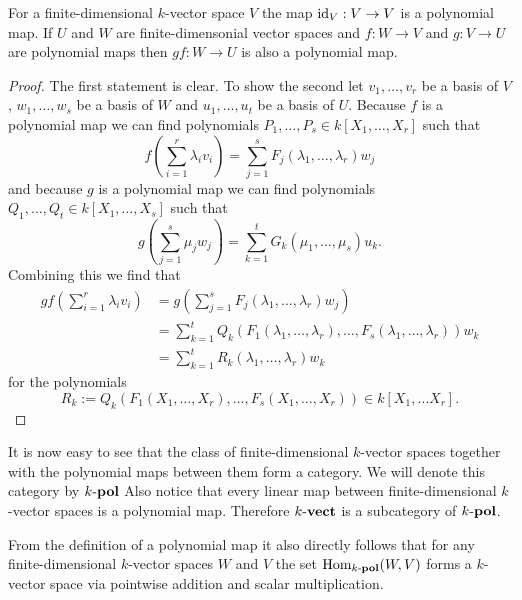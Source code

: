 \begin{lem}
 For a finite-dimensional $k$-vector space $V$ the map $\operatorname{id}_V : V \to V$ is a polynomial map. If $U$ and $W$ are finite-dimensonial vector spaces and $f : W \to V$ and $g : V \to U$ are polynomial maps then $gf : W \to U$ is also a polynomial map.
\end{lem}
\begin{proof}
 The first statement is clear. To show the second let $v_1, \ldots, v_r$ be a basis of $V$, $w_1, \ldots, w_s$ be a basis of $W$ and $u_1, \ldots, u_t$ be a basis of $U$. Because $f$ is a polynomial map we can find polynomials $P_1, \ldots, P_s \in k[X_1, \ldots, X_r]$ such that
 \[
  f\left(\sum_{i=1}^r \lambda_i v_i\right) = \sum_{j=1}^s F_j(\lambda_1, \ldots, \lambda_r) w_j
 \]
 and because $g$ is a polynomial map we can find polynomials $Q_1, \ldots, Q_t \in k[X_1, \ldots, X_s]$ such that
 \[
  g\left(\sum_{j=1}^s \mu_j w_j\right) = \sum_{k=1}^t G_k(\mu_1, \ldots, \mu_s) u_k.
 \]
 Combining this we find that
 \begin{align*}
  gf\left(\sum_{i=1}^r \lambda_i v_i\right)
  &= g\left(\sum_{j=1}^s F_j(\lambda_1, \ldots, \lambda_r) w_j\right) \\
  &= \sum_{k=1}^t Q_k(F_1(\lambda_1, \ldots, \lambda_r), \ldots, F_s(\lambda_1, \ldots, \lambda_r)) w_k \\
  &= \sum_{k=1}^t R_k(\lambda_1, \ldots, \lambda_r) w_k
 \end{align*}
 for the polynomials
 \[
  R_k := Q_k(F_1(X_1, \ldots, X_r), \ldots, F_s(X_1, \ldots, X_r)) \in k[X_1, \ldots X_r].
 \]
\end{proof}


It is now easy to see that the class of finite-dimensional $k$-vector spaces together with the polynomial maps between them form a category. We will denote this category by $k\text{-}\mathbf{pol}$  Also notice that every linear map between finite-dimensional $k$-vector spaces is a polynomial map. Therefore $k\text{-}\mathbf{vect}$ is a subcategory of $k\text{-}\mathbf{pol}$.

From the definition of a polynomial map it also directly follows that for any finite-dimensional $k$-vector spaces $W$ and $V$ the set $\operatorname{Hom}_{k\text{-}\mathbf{pol}}(W,V)$ forms a $k$-vector space via pointwise addition and scalar multiplication. 


